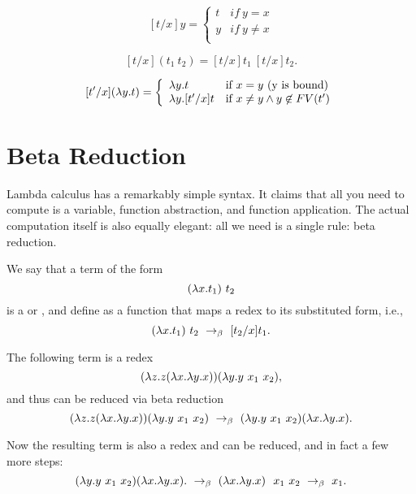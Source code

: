 \begin{definition}
\label{def:lambda:sub-final}
\[
[t/x]y = \left\{ \begin{array}{ll}
        t & if~y = x \\
        y & if~y\neq x \\
        \end{array} \right.
\]


\[
[t/x](t_1~t_2) = [t/x]t_1~[t/x]t_2.
 \]

\[
[t'/x](\lambda y.t) = 
\left\{ \begin{array}{ll}

\lambda y.t &\mbox{if}~ x = y \mbox{ (y is bound)} \\

\lambda y.[t'/x]t &\mbox{if}~ x \neq y \land y \not \in FV(t') \\

\end{array} \right. 
\]
\end{definition}

\section{Beta Reduction}

Lambda calculus has a remarkably simple syntax.  It claims that all you need to compute is a variable,  function abstraction, and function application.
%
The actual computation itself is also equally elegant: all we need is a single rule: beta reduction.
%

\begin{definition}
\label{def:lcb:beta-reduction}
We say that a term of the form 
\[
(\lambda x.t_1)~t_2 
\]
is  a  or ,
%
and
%
define  as a function that maps a redex to its substituted form, i.e.,
\[
(\lambda x.t_1)~t_2 ~\rightarrow_{\beta}~ [t_2/x] t_1 .
\]
\end{definition}

\begin{example}
The following term is a redex
\[
(\lambda z. z (\lambda x. \lambda y. x)) (\lambda y. y~x_1~x_2), 
\]
and thus can be reduced via beta reduction
\[
(\lambda z. z (\lambda x. \lambda y. x)) (\lambda y. y~x_1~x_2) 
~\rightarrow_{\beta}~
(\lambda y. y~x_1~x_2) (\lambda x. \lambda y. x).
\]

Now the resulting term is also a redex and can be reduced, and in fact a few more steps:
\[
(\lambda y. y~x_1~x_2) (\lambda x. \lambda y. x).
~\rightarrow_{\beta}~
(\lambda x. \lambda y. x)~~x_1~x_2
~\rightarrow_{\beta}~
x_1.
\]
\end{example}


